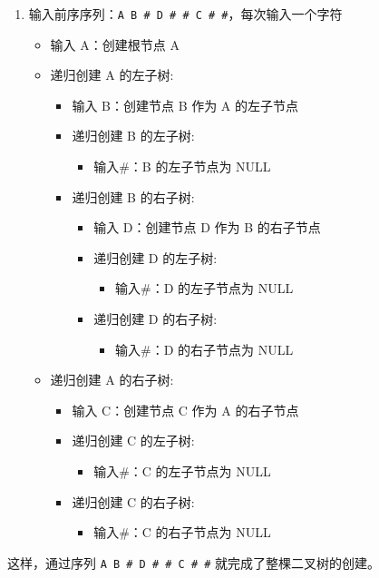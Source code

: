 \begin{enumerate}
	\item 输入前序序列：\lstinline{A B # D # # C # #}，每次输入一个字符
	\begin{itemize}
		\item 输入 A：创建根节点 A
		\item 递归创建 A 的左子树:
		\begin{itemize}
			\item 输入 B：创建节点 B 作为 A 的左子节点
			\item 递归创建 B 的左子树:
			\begin{itemize}
				\item 输入\#：B 的左子节点为 NULL
			\end{itemize}
			\item 递归创建 B 的右子树:
			\begin{itemize}
				\item 输入 D：创建节点 D 作为 B 的右子节点
				\item 递归创建 D 的左子树:
				\begin{itemize}
					\item 输入\#：D 的左子节点为 NULL
				\end{itemize}
				\item 递归创建 D 的右子树:
				\begin{itemize}
					\item 输入\#：D 的右子节点为 NULL
				\end{itemize}
			\end{itemize}
		\end{itemize}
		\item 递归创建 A 的右子树:
		\begin{itemize}
			\item 输入 C：创建节点 C 作为 A 的右子节点
			\item 递归创建 C 的左子树:
			\begin{itemize}
				\item 输入\#：C 的左子节点为 NULL
			\end{itemize}
			\item 递归创建 C 的右子树:
			\begin{itemize}
				\item 输入\#：C 的右子节点为 NULL
			\end{itemize}
		\end{itemize}
	\end{itemize}
\end{enumerate}

这样，通过序列 \lstinline{A B # D # # C # #} 就完成了整棵二叉树的创建。

